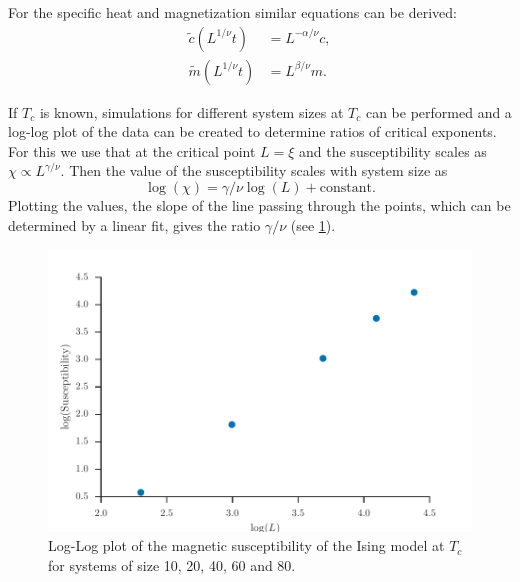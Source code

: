 \documentclass[11pt, a4paper]{report} %
\begin{document}
For the specific heat and magnetization similar equations can be derived\cite{newman:1999}:
\begin{align}
	\widetilde{c}(L^{1/\nu}t) &= L^{-\alpha/\nu} c, \\
	\widetilde{m}(L^{1/\nu}t) &= L^{\beta/\nu} m.
\end{align}

If \(T_c\) is known, simulations for different system sizes at \(T_c\) can be performed and a log-log plot of the data can be created to determine ratios of critical exponents.
For this we use that at the critical point \(L = \xi\) and the susceptibility scales as \(\chi \propto L^{\gamma/\nu}\).
Then the value of the susceptibility scales with system size as
\begin{equation}
	\log(\chi) = \gamma/\nu \log(L) + \mathrm{constant}.
\end{equation}
Plotting the values, the slope of the line passing through the points, which can be determined by a linear fit, gives the ratio \(\gamma/\nu\) (see \cref{fig:ising_magnetizabilities_loglog_plot}).\cite{corboz}

\begin{figure}[h]
	\centering
	\includegraphics[width=\textwidth]{ising_magnetizabilities_loglog_plot.pdf}
	\caption{Log-Log plot of the magnetic susceptibility of the Ising model at \(T_c\) for systems of size 10, 20, 40, 60 and 80.}
	\label{fig:ising_magnetizabilities_loglog_plot}
\end{figure}
\end{document}
